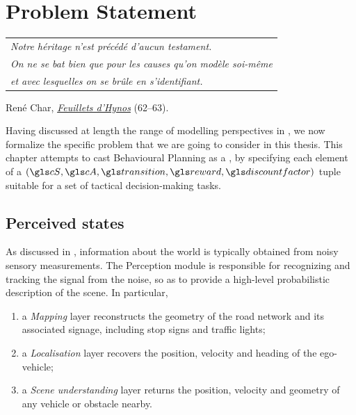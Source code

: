 
\graphicspath{{2-Chapters/3-Chapter/}}

\chapter{Problem Statement}
\label{chapter:3}

\begin{flushright}
	\begin{tabular}{@{}l@{}}
		\emph{Notre héritage n'est précédé d'aucun testament.}\\
		\emph{On ne se bat bien que pour les causes qu'on modèle soi-même}\\
		\emph{et avec lesquelles on se brûle en s'identifiant.}\\
	\end{tabular}
	
	René Char, \href{https://eleurent.github.io/sisyphe/texts/feuillets-d-hypnos.html}{\emph{Feuillets d'Hynos}} {\small (62--63)}.
\end{flushright}


\abstractStartChapter{}%
Having discussed at length the range of  modelling perspectives in , we now formalize the specific problem that we are going to consider in this thesis. This chapter attempts to cast Behavioural Planning as a , by specifying each element of a $(\cS, \cA, \Ps, \R, \discount)$ tuple suitable for a set of tactical decision-making tasks.
\minitocStartChapter{}

\section{Perceived states}

As discussed in , information about the world is typically obtained from noisy sensory measurements. The Perception module is responsible for recognizing and tracking the signal from the noise, so as to provide a high-level probabilistic description of the scene. In particular, 
\begin{enumerate}[label=(\roman*)]
	\item a \emph{Mapping} layer reconstructs the geometry of the road network and its associated signage, including stop signs and traffic lights;
	\item a \emph{Localisation} layer recovers the position, velocity and heading of the ego-vehicle;
	\item a \emph{Scene understanding} layer returns the position, velocity and geometry of any vehicle or obstacle nearby.
\end{enumerate}

